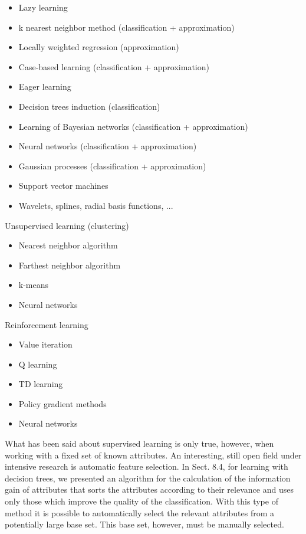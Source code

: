 \documentclass[10pt]{article}
\begin{document}
\begin{itemize}
  \item Lazy learning
  \item k nearest neighbor method (classification + approximation)
  \item Locally weighted regression (approximation)
  \item Case-based learning (classification + approximation)
  \item Eager learning
  \item Decision trees induction (classification)
  \item Learning of Bayesian networks (classification + approximation)
  \item Neural networks (classification + approximation)
  \item Gaussian processes (classification + approximation)
  \item Support vector machines
  \item Wavelets, splines, radial basis functions, ...
\end{itemize}

Unsupervised learning (clustering)

\begin{itemize}
  \item Nearest neighbor algorithm
  \item Farthest neighbor algorithm
  \item k-means
  \item Neural networks
\end{itemize}

Reinforcement learning

\begin{itemize}
  \item Value iteration
  \item Q learning
  \item TD learning
  \item Policy gradient methods
  \item Neural networks
\end{itemize}

What has been said about supervised learning is only true, however, when working with a fixed set of known attributes. An interesting, still open field under intensive research is automatic feature selection. In Sect. 8.4, for learning with decision trees, we presented an algorithm for the calculation of the information gain of attributes that sorts the attributes according to their relevance and uses only those which improve the quality of the classification. With this type of method it is possible to automatically select the relevant attributes from a potentially large base set. This base set, however, must be manually selected.
\end{document}
